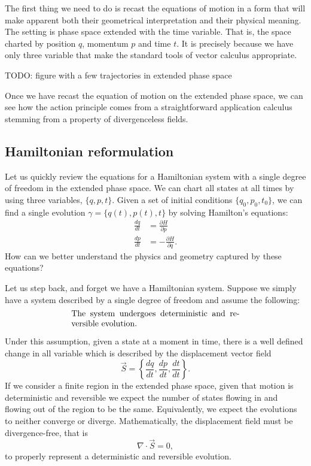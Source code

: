 \documentclass[10pt,twocolumn, nofootinbib]{revtex4-2}
\begin{document}
The first thing we need to do is recast the equations of motion in a form that will make apparent both their geometrical interpretation and their physical meaning. The setting is phase space extended with the time variable. That is, the space charted by position $q$, momentum $p$ and time $t$. It is precisely because we have only three variable that make the standard tools of vector calculus appropriate.

TODO: figure with a few trajectories in extended phase space

Once we have recast the equation of motion on the extended phase space, we can see how the action principle comes from a straightforward application calculus stemming from a property of divergenceless fields.

\subsection{Hamiltonian reformulation}

Let us quickly review the equations for a Hamiltonian system with a single degree of freedom in the extended phase space. We can chart all states at all times by using three variables, $\{q,p,t\}$. Given a set of initial conditions $\{q_0,p_0,t_0\}$, we can find a single evolution $\gamma = \{q(t), p(t), t\}$ by solving Hamilton's equations:
\begin{equation}\label{Hamilton_equations}
\begin{aligned}
	\frac{dq}{dt} &= \frac{\partial H}{\partial p} \\
	\frac{dp}{dt} &= -\frac{\partial H}{\partial q}.
\end{aligned}
\end{equation}
How can we better understand the physics and geometry captured by these equations?

Let us step back, and forget we have a Hamiltonian system. Suppose we simply have a system described by a single degree of freedom and assume the following:
\begin{align}\label{Detrev_assumptions}
	\parbox{2.8in}{The system undergoes deterministic and reversible evolution.}
\end{align}

Under this assumption, given a state at a moment in time, there is a well defined change in all variable which is described by the displacement vector field
\begin{equation}
	\vec{S} = \left\{ \frac{dq}{dt},\frac{dp}{dt},\frac{dt}{dt} \right\}.
\end{equation}
If we consider a finite region in the extended phase space, given that motion is deterministic and reversible we expect the number of states flowing in and flowing out of the region to be the same. Equivalently, we expect the evolutions to neither converge or diverge. Mathematically, the displacement field must be divergence-free, that is
\begin{equation}
	\nabla \cdot \vec{S} = 0,
\end{equation}
to properly represent a deterministic and reversible evolution.
\end{document}
